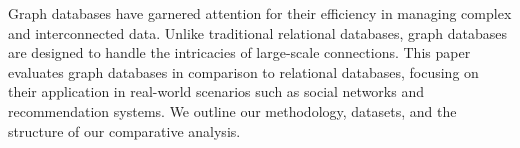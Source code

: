 Graph databases have garnered attention for their efficiency in managing complex and interconnected data. Unlike traditional relational databases, graph databases are designed to handle the intricacies of large-scale connections. This paper evaluates graph databases in comparison to relational databases, focusing on their application in real-world scenarios such as social networks and recommendation systems. We outline our methodology, datasets, and the structure of our comparative analysis.
